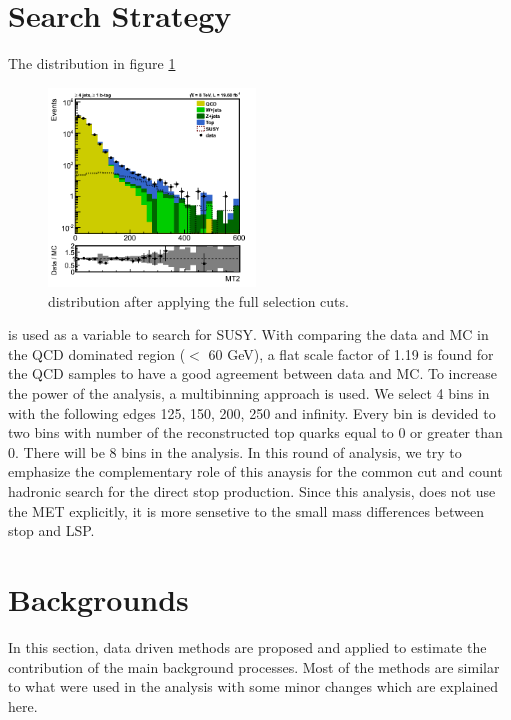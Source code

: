\section{Search Strategy}
\label{sect:search}
The \mttwo distribution in figure \ref{fig:MT2}
\begin{figure}[!htb]
\centering
\includegraphics[width=0.49\textwidth]{figs/MT2SmearedJetMET.png}
\caption{\mttwo distribution after applying the full selection cuts.}
\label{fig:MT2}
\end{figure}
is used as a variable to search for SUSY. With comparing the data and MC in the QCD dominated region (\mttwo $<$ 60 GeV), 
a flat scale factor of 1.19 is found for the QCD samples to have a good agreement between data and MC.
To increase the power of the analysis, a multibinning approach is used.
We select 4 bins in \mttwo with the following edges 125, 150, 200, 250 and infinity.
Every \mttwo bin is devided to two bins with number of the reconstructed top quarks equal to 0 or greater than 0.
There will be 8 bins in the analysis. In this round of analysis, we try to emphasize the complementary role of this anaysis
for the common cut and count hadronic search for the direct stop production. Since this analysis, does not use the MET explicitly, 
it is more sensetive to the small mass differences between stop and LSP.
\section{Backgrounds}
\label{sect:bkg}
In this section, data driven methods are proposed and applied to estimate the contribution of the main background processes. 
Most of the methods are similar to what were used in the \mttwo analysis \cite{MT2_2011} with some minor changes which are explained
here.

